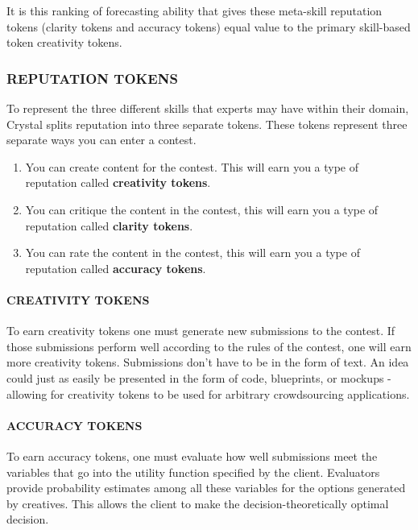 It is this ranking of forecasting ability that gives these meta-skill
reputation tokens (clarity tokens and accuracy tokens) equal value to
the primary skill-based token creativity tokens.

\subsubsection{\texorpdfstring{\protect\hypertarget{_t7frhn7cs0ly}{}{\protect\hypertarget{_Toc462050413}{}{}}REPUTATION
TOKENS}{REPUTATION TOKENS}}\label{reputation-tokens}

To represent the three different skills that experts may have within
their domain, Crystal splits reputation into three separate tokens.
These tokens represent three separate ways you can enter a contest.

\begin{enumerate}
\def\labelenumi{\arabic{enumi}.}
\item
  You can create content for the contest. This will earn you a type of
  reputation called \textbf{creativity tokens}.
\item
  You can critique the content in the contest, this will earn you a type
  of reputation called \textbf{clarity tokens}.
\item
  You can rate the content in the contest, this will earn you a type of
  reputation called \textbf{accuracy tokens}.
\end{enumerate}

\paragraph{CREATIVITY TOKENS}\label{creativity-tokens}

To earn creativity tokens one must generate new submissions to the
contest. If those submissions perform well according to the rules of the
contest, one will earn more creativity tokens. Submissions don't have to
be in the form of text. An idea could just as easily be presented in the
form of code, blueprints, or mockups - allowing for creativity tokens to
be used for arbitrary crowdsourcing applications.

\paragraph{ACCURACY TOKENS}\label{accuracy-tokens}

To earn accuracy tokens, one must evaluate how well submissions meet the
variables that go into the utility function specified by the client.
Evaluators provide probability estimates among all these variables for
the options generated by creatives. This allows the client to make the
decision-theoretically optimal decision.


